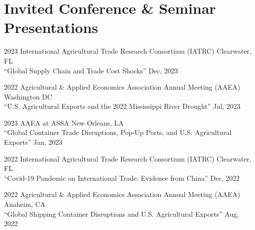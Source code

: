\documentclass[10.5 pt,letterpaper]{article}
\renewenvironment{itemize}{
	\begin{list}{}{
			\setlength{\leftmargin}{1.5em}
		}
	}{
	\end{list}
}
\begin{document}
	
	
	
	
	\section*{\textbf{Invited Conference \& Seminar Presentations}}
	
	
	
	\begin{itemize}
		
			\item[-]	2023 International Agricultural Trade Research Consortium (IATRC)  \hfill Clearwater, FL\vspace{0.15cm} \\
``Global Supply Chain and Trade Cost Shocks'' \hfill   Dec, 2023


		\item[-]	2022  Agricultural \& Applied Economics  Association Annual Meeting (AAEA)   \hfill   Washington DC\vspace{0.15cm} \\
``U.S. Agricultural Exports and the 2022 Mississippi River Drought''  \hfill Jul, 2023



   \item[-]  2023 AAEA at ASSA    \hfill   New Orleans, LA\vspace{0.15cm} \\
	``Global Container Trade Disruptions, Pop-Up Ports, and U.S. Agricultural Exports''  \hfill Jan, 2023 

 

			\item[-]	2022  International Agricultural Trade Research Consortium (IATRC)   \hfill Clearwater, FL\vspace{0.15cm} \\
	``Covid-19 Pandemic on International Trade: Evidence from China'' \hfill   Dec, 2022
	
	
		\item[-]	2022  Agricultural \& Applied Economics  Association Annual Meeting (AAEA)   \hfill   Anaheim, CA\vspace{0.15cm} \\
			``Global Shipping Container Disruptions and U.S. Agricultural Exports''   \hfill   Aug, 2022
			

\end{itemize}
\end{document}
